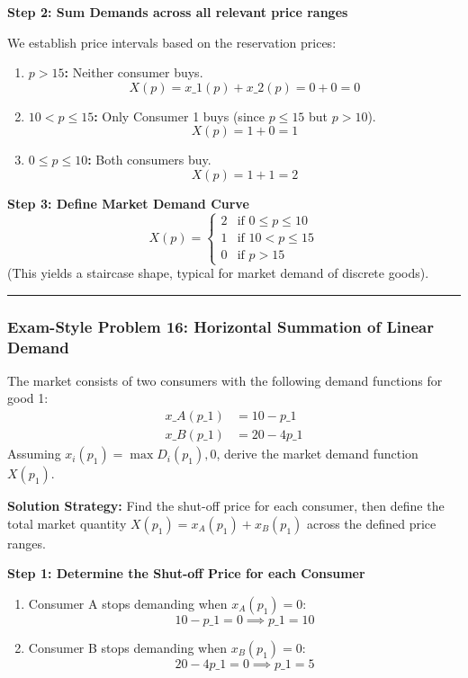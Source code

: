 \documentclass{article}
\begin{document}
\textbf{Step 2: Sum Demands across all relevant price ranges} 

We establish price intervals based on the reservation prices:
\begin{enumerate}
    \item \textbf{$p > 15$:} Neither consumer buys. 
    \[ X(p) = x\_1(p) + x\_2(p) = 0 + 0 = 0 \]
    \item \textbf{$10 < p \leq 15$:} Only Consumer 1 buys (since $p \leq 15$ but $p > 10$). 
    \[ X(p) = 1 + 0 = 1 \]
    \item \textbf{$0 \leq p \leq 10$:} Both consumers buy. 
    \[ X(p) = 1 + 1 = 2 \]
\end{enumerate}

\textbf{Step 3: Define Market Demand Curve}
\[ X(p) = \begin{cases} 2 & \text{if } 0 \leq p \leq 10 \\ 1 & \text{if } 10 < p \leq 15 \\ 0 & \text{if } p > 15 \end{cases} \]
(This yields a staircase shape, typical for market demand of discrete goods).

\bigskip
\noindent\rule{\linewidth}{0.4pt}
\bigskip

\subsubsection*{Exam-Style Problem 16: Horizontal Summation of Linear Demand}

The market consists of two consumers with the following demand functions for good 1: 
\begin{align*}
x\_A(p\_1) &= 10 - p\_1 \\
x\_B(p\_1) &= 20 - 4p\_1
\end{align*}
Assuming $x_i(p_1) = \max{D_i(p_1), 0}$, derive the market demand function $X(p_1)$.

\textbf{Solution Strategy:} Find the shut-off price for each consumer, then define the total market quantity $X(p_1) = x_A(p_1) + x_B(p_1)$ across the defined price ranges.

\textbf{Step 1: Determine the Shut-off Price for each Consumer}
\begin{enumerate}
    \item Consumer A stops demanding when $x_A(p_1) = 0$: 
    \[ 10 - p\_1 = 0 \implies p\_1 = 10 \]
    \item Consumer B stops demanding when $x_B(p_1) = 0$: 
    \[ 20 - 4p\_1 = 0 \implies p\_1 = 5 \]
\end{enumerate}
\end{document}
